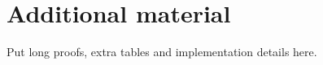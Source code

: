 \chapter{Additional material}
\label{app:extra}

Put long proofs, extra tables and implementation details here.
